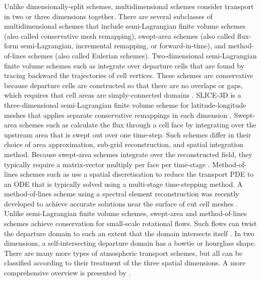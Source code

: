 Unlike dimensionally-split schemes, multidimensional schemes consider transport in two or three dimensions together.
There are several subclasses of multidimensional schemes that include
semi-Lagrangian finite volume schemes (also called conservative mesh remapping),
swept-area schemes (also called flux-form semi-Lagrangian, incremental remapping, or forward-in-time),
and method-of-lines schemes (also called Eulerian schemes).
Two-dimensional semi-Lagrangian finite volume schemes such as \citet{iske-kaeser2004,lauritzen2010} integrate over departure cells that are found by tracing backward the trajectories of cell vertices.  These schemes are conservative because departure cells are constructed so that there are no overlaps or gaps, which requires that cell areas are simply-connected domains \citep{lauritzen2011book}.
SLICE-3D is a three-dimensional semi-Lagrangian finite volume scheme for latitude-longitude meshes that applies separate conservative remappings in each dimension \citep{zerroukat-allen2012}.
Swept-area schemes such as \citet{lashley2002,skamarock-menchaca2010,lauritzen2011,thuburn2014} calculate the flux through a cell face by integrating over the upstream area that is swept out over one time-step.  Such schemes differ in their choice of area approximation, sub-grid reconstruction, and spatial integration method.
Because swept-area schemes integrate over the reconstructed field, they typically require a matrix-vector multiply per face per time-stage \citep{thuburn2014,skamarock-menchaca2010}.
Method-of-lines schemes such as \citet{weller2009,skamarock-gassmann2011} use a spatial discretisation to reduce the transport PDE to an ODE that is typically solved using a multi-stage time-stepping method.
A method-of-lines scheme using a spectral element reconstruction was recently developed to achieve accurate solutions near the surface of cut cell meshes \citep{steppeler-klemp2017}.
Unlike semi-Lagrangian finite volume schemes, swept-area and method-of-lines schemes achieve conservation for small-scale rotational flows.
Such flows can twist the departure domain to such an extent that the domain intersects itself \citep{lauritzen2011}.  In two dimensions, a self-intersecting departure domain has a bowtie or hourglass shape.
There are many more types of atmospheric transport schemes, but all can be classified according to their treatment of the three spatial dimensions.  A more comprehensive overview is presented by \citet{lauritzen2014}.


